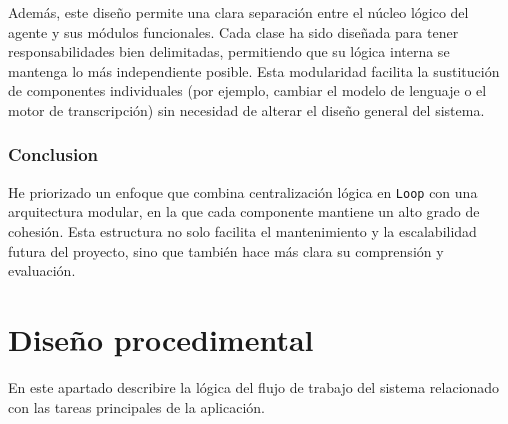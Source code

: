 Además, este diseño permite una clara separación entre el núcleo lógico del agente y sus módulos funcionales. Cada clase ha sido diseñada para tener responsabilidades bien delimitadas, permitiendo que su lógica interna se mantenga lo más independiente posible. Esta modularidad facilita la sustitución de componentes individuales (por ejemplo, cambiar el modelo de lenguaje o el motor de transcripción) sin necesidad de alterar el diseño general del sistema.

\subsubsection{Conclusion}
He priorizado un enfoque que combina centralización lógica en \texttt{Loop} con una arquitectura modular, en la que cada componente mantiene un alto grado de cohesión. Esta estructura no solo facilita el mantenimiento y la escalabilidad futura del proyecto, sino que también hace más clara su comprensión y evaluación.

\section{Diseño procedimental}

En este apartado describire la lógica del flujo de trabajo del sistema relacionado con las tareas principales de la aplicación.


